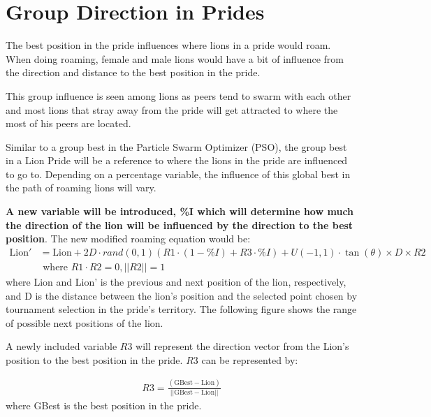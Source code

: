\section{Group Direction in Prides}
\par The best position in the pride influences where lions in a pride would roam. When doing roaming, female and male lions would have a bit of influence from the direction and distance to the best position in the pride.

\par This group influence is seen among lions as peers tend to swarm with each other and most lions that stray away from the pride will get attracted to where the most of his peers are located.

\par Similar to a group best in the Particle Swarm Optimizer (PSO), the group best in a Lion Pride will be a reference to where the lions in the pride are influenced to go to. Depending on a percentage variable, the influence of this global best in the path of roaming lions will vary.

\textbf{A new variable will be introduced, \%I which will determine how much the direction of the lion will be influenced by the direction to the best position}. The new modified roaming equation would be:
\begin{align*}
\text{Lion}' &= \text{Lion} + 2D \cdot rand(0,1) ({R1}\cdot(1-\%I) + R3\cdot\%I) + U(-1,1) \cdot \tan(\theta) \times D \times {R2} \\
&\text{  where } R1 \cdot R2 = 0, ||R2|| = 1
\end{align*}
where Lion and Lion' is the previous and next position of the  lion, respectively, and D is the distance between the  lion's position and the selected point chosen by tournament selection in the pride's territory. The following figure shows the range of possible next positions of the lion.

\par A newly included variable $R3$ will represent the direction vector from the Lion's position to the best position in the pride. $R3$ can be represented by:

\begin{align*}
  R3 = \frac{(\text{GBest} - \text{Lion})}{||\text{GBest} - \text{Lion}||}
\end{align*}
where GBest is the best position in the pride.

